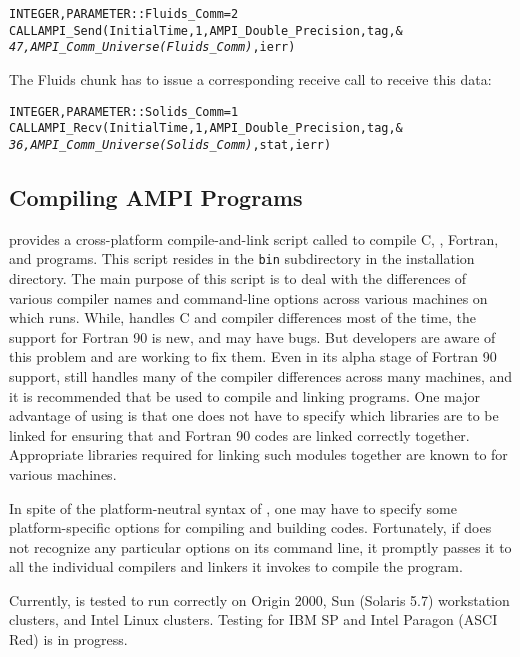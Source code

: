 \documentclass[10pt]{article}
\begin{document}
\begin{alltt}
INTEGER , PARAMETER :: Fluids_Comm = 2
CALL AMPI_Send(InitialTime, 1, AMPI_Double_Precision, tag, &
        \emph{47, AMPI_Comm_Universe(Fluids_Comm)}, ierr)
\end{alltt}

The Fluids chunk has to issue a corresponding receive call to receive this
data:

\begin{alltt}
INTEGER , PARAMETER :: Solids_Comm = 1
CALL AMPI_Recv(InitialTime, 1, AMPI_Double_Precision, tag, &
        \emph{36, AMPI_Comm_Universe(Solids_Comm)}, stat, ierr)
\end{alltt}

\subsection{Compiling AMPI Programs}

\charmpp{} provides a cross-platform compile-and-link script called \charmc{}
to compile C, \CC{}, Fortran, \charmpp{} and \ampi{} programs.  This script
resides in the \texttt{bin} subdirectory in the \charmpp{} installation
directory. The main purpose of this script is to deal with the differences of
various compiler names and command-line options across various machines on
which \charmpp{} runs. While, \charmc{} handles C and \CC{} compiler
differences most of the time, the support for Fortran 90 is new, and may have
bugs. But \charmpp{} developers are aware of this problem and are working to
fix them. Even in its alpha stage of Fortran 90 support, \charmc{} still
handles many of the compiler differences across many machines, and it is
recommended that \charmc{} be used to compile and linking \ampi{} programs. One
major advantage of using \charmc{} is that one does not have to specify which
libraries are to be linked for ensuring that \CC{} and Fortran 90 codes are
linked correctly together. Appropriate libraries required for linking such
modules together are known to \charmc{} for various machines.

In spite of the platform-neutral syntax of \charmc{}, one may have to specify
some platform-specific options for compiling and building \ampi{} codes.
Fortunately, if \charmc{} does not recognize any particular options on its
command line, it promptly passes it to all the individual compilers and linkers
it invokes to compile the program.

Currently, \ampi{} is tested to run correctly on Origin 2000, Sun (Solaris 5.7)
workstation clusters, and Intel Linux clusters. Testing for IBM SP and Intel
Paragon (ASCI Red) is in progress.
\end{document}
